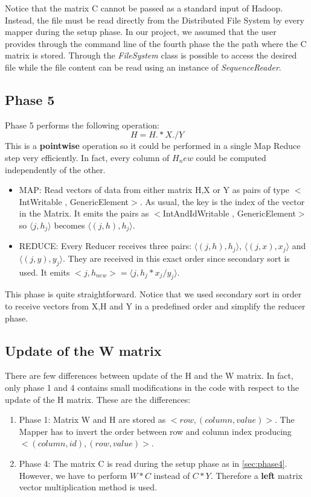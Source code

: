 \documentclass[a4paper,12pt]{article}
\newcommand{\CLASS}[1] {\textit{#1}}
\begin{document}
Notice that the matrix C cannot be passed as a standard input of Hadoop.
Instead, the file must be read directly from the Distributed File System by every mapper during the setup phase. 
In our project, we assumed that the user provides through the command line of the fourth phase the the path where the C matrix is stored. 
Through the \CLASS{FileSystem} class is possible to access the desired file while the file content can be read using an instance of \CLASS{SequenceReader}.

\subsection{Phase 5}
\label{sec:phase5}

Phase 5 performs the following operation:
$$ H = H.*X./Y$$
This is a \textbf{pointwise} operation so it could be performed in a single Map Reduce step very efficiently.
In fact, every column of $H_new$ could be computed independently of the other.
\begin{itemize}

         \item MAP: Read vectors of data from either matrix H,X or Y as pairs of type $<$IntWritable , GenericElement$>$.
         As usual, the key is the index of the vector in the Matrix.
         It emits the pairs as $<$IntAndIdWritable , GenericElement$>$ so $\langle j, h_j \rangle$ becomes $\langle (j,h), h_j \rangle$.

          \item REDUCE: Every Reducer receives three pairs: $\langle (j,h), h_j \rangle$, $\langle (j,x), x_j \rangle$ and $\langle (j,y), y_j \rangle$. They are received in this exact order since secondary sort is used. It emits $<j,h_{new}> = \langle j, h_j*x_j/y_j \rangle$.

\end{itemize}

This phase is quite straightforward.
Notice that we used secondary sort in order to receive vectors from X,H and Y in a predefined order and simplify the reducer phase.

\subsection{Update of the W matrix}
\label{sec:Wphase}

There are few differences between update of the H and the W matrix.
In fact, only phase 1 and 4 contains small modifications in the code with respect to the update of the H matrix.
These are the differences:
\begin{enumerate}
\item Phase 1: Matrix W and H are stored as $<row, (column,value)>$. 
The Mapper has to invert the order between row and column index producing $<(column,id),(row,value)>$.
\item Phase 4: The matrix C is read during the setup phase as in \ref{sec:phase4}. 
However, we have to perform $W*C$ instead of $C*Y$.
Therefore a \textbf{left} matrix vector multiplication method is used.
\end{enumerate}
\end{document}
